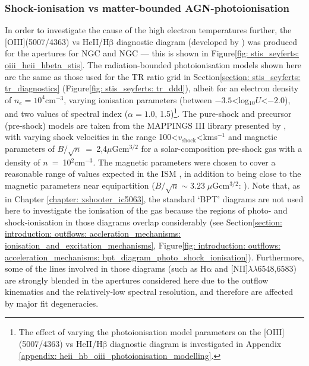 \subsubsection{Shock-ionisation vs matter-bounded AGN-photoionisation}
\label{section: stis_seyferts: shock_vs_agn}

In order to investigate the cause of the high electron temperatures further, the [OIII](5007/4363) vs HeII/H$\mathrm{\beta}$ diagnostic diagram (developed by \citealt{VillarMartin1999}) was produced for the apertures for NGC and NGC --- this is shown in Figure\;\ref{fig: stis_seyferts: oiii_heii_hbeta_stis}. The radiation-bounded photoionisation models shown here are the same as those used for the TR ratio grid in Section\;\ref{section: stis_seyferts: tr_diagnostics} (Figure\;\ref{fig: stis_seyferts: tr_ddd}), albeit for an electron density of $n_e=10^{4}$\;cm$^{-3}$, varying ionisation parameters (between $-3.5$\;\textless\;log$_{10}U$\;\textless\;$-2.0$), and two values of spectral index ($\alpha=1.0$, 1.5)\footnote{The effect of varying the photoionisation model parameters on the [OIII](5007/4363) vs HeII/H$\mathrm{\beta}$ diagnostic diagram is investigated in Appendix \ref{appendix: heii_hb_oiii_photoionisation_modelling}.}. The pure-shock and precursor (pre-shock) models are taken from the \textsc{MAPPINGS III} library presented by \citet{Allen2008}, with varying shock velocities in the range 100\;\textless\;$v_\mathrm{shock}$\;\textless{}\;km\;s$^{-1}$ and magnetic parameters of \mbox{$B/\sqrt{n}$ = 2,4\;$\mu$G\;cm$^{3/2}$} for a solar-composition pre-shock gas with a density of \mbox{$n$ = 10$^{2}$\;cm$^{-3}$}. The magnetic parameters were chosen to cover a reasonable range of values expected in the ISM \citep{Dopita1995}, in addition to being close to the magnetic parameters near equipartition (\mbox{$B/\sqrt{n}\sim3.23\;\mu$G\;cm$^{3/2}$}: \citealt{Allen2008}). Note that, as in Chapter \ref{chapter: xshooter_ic5063}, the standard `BPT' diagrams \citep{Baldwin1981} are not used here to investigate the ionisation of the gas because the regions of photo- and shock-ionisation in those diagrams overlap considerably (see Section\;\ref{section: introduction: outflows: accleration_mechanisms: ionisation_and_excitation_mechanisms}, Figure\;\ref{fig: introduction: outflows: acceleration_mechanisms: bpt_diagram_photo_shock_ionisation}). Furthermore, some of the lines involved in those diagrams (such as H$\mathrm{\alpha}$ and [NII]$\lambda\lambda$6548,6583) are strongly blended in the apertures considered here due to the outflow kinematics and the relatively-low spectral resolution, and therefore are affected by major fit degeneracies.

